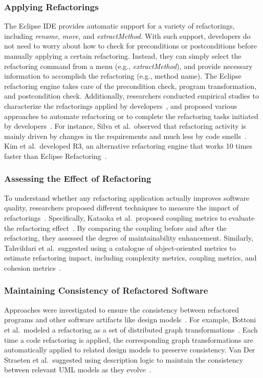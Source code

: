 \documentclass[runningheads,a4paper]{llncs}
\begin{document}
\subsubsection{Applying Refactorings}
The Eclipse IDE provides automatic support for a variety of refactorings, including \emph{rename}, \emph{move}, and \emph{extractMethod}. With such support, developers do not need to worry about how to check for preconditions or postconditions before manually applying a certain refactoring. Instead, they can simply select the refactoring command from a menu (e.g., \emph{extractMethod}), and provide necessary information to accomplish the refactoring (e.g., method name). The Eclipse refactoring engine takes care of the precondition check, program transformation, and postcondition check. Additionally, 
researchers conducted empirical studies to characterize the refactorings applied by developers~\cite{Kim2012:FSR,Murphy-Hill2012:refactor,Vailian2012:misuse,Silva2016:WWR}, and proposed various approaches to automate refactoring or to complete the refactoring tasks initiated by developers~\cite{Griswold:1992,Balazinska1999,Dig:2009,Ge:2012,Chen:2013,Lee:2013,Tsantalis2013:icsm,Meng:2015,Kim:2016}. For instance, Silva et al.~observed that refactoring activity is mainly driven by changes in the requirements and much less by code smells~\cite{Silva2016:WWR}. Kim et al.~developed R3, an alternative refactoring engine that works 10 times faster than Eclipse Refactoring~\cite{Kim:2016}. 

\subsubsection{Assessing the Effect of Refactoring} 
To understand whether any refactoring application actually improves software quality, researchers proposed 
different techniques to measure the impact of refactorings~\cite{Kataoka2002:evaluateRefactor,Tahvildari2003:MAE}. Specifically, Kataoka et al.~proposed coupling metrics to evaluate the refactoring effect~\cite{Kataoka2002:evaluateRefactor}. By comparing the coupling before and after the refactoring, they assessed the degree of maintainability enhancement. Similarly, Tahvildari et al.~suggested using a catalogue of object-oriented metrics to estimate refactoring impact, including complexity metrics, coupling metrics, and cohesion metrics~\cite{Tahvildari2003:MAE}. 


\subsubsection{Maintaining Consistency of Refactored Software} 
Approaches were investigated to ensure the consistency between refactored programs and other software artifacts like design models~\cite{Bottoni2003:coordinatedTransformation,Straeten2003:UML}. For example, Bottoni et al.~modeled a refactoring as a set of distributed graph transformations~\cite{Bottoni2003:coordinatedTransformation}. Each time a code refactoring is applied, the corresponding graph transformations are automatically applied to related design models to preserve consistency. Van Der Straeten et al.~suggested using description logic to maintain the consistency between relevant UML models as they evolve~\cite{Straeten2003:UML}.
\end{document}
